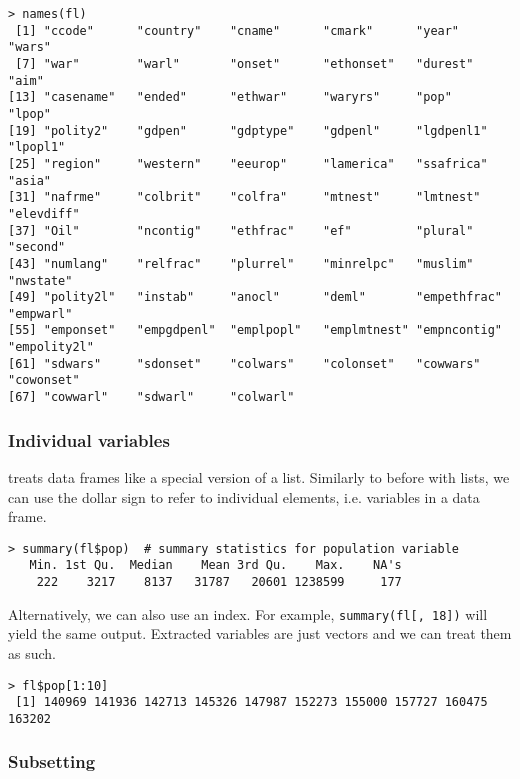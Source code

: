 \begin{lstlisting}
> names(fl)
 [1] "ccode"      "country"    "cname"      "cmark"      "year"       "wars"      
 [7] "war"        "warl"       "onset"      "ethonset"   "durest"     "aim"       
[13] "casename"   "ended"      "ethwar"     "waryrs"     "pop"        "lpop"      
[19] "polity2"    "gdpen"      "gdptype"    "gdpenl"     "lgdpenl1"   "lpopl1"    
[25] "region"     "western"    "eeurop"     "lamerica"   "ssafrica"   "asia"      
[31] "nafrme"     "colbrit"    "colfra"     "mtnest"     "lmtnest"    "elevdiff"  
[37] "Oil"        "ncontig"    "ethfrac"    "ef"         "plural"     "second"    
[43] "numlang"    "relfrac"    "plurrel"    "minrelpc"   "muslim"     "nwstate"   
[49] "polity2l"   "instab"     "anocl"      "deml"       "empethfrac" "empwarl"   
[55] "emponset"   "empgdpenl"  "emplpopl"   "emplmtnest" "empncontig" "empolity2l"
[61] "sdwars"     "sdonset"    "colwars"    "colonset"   "cowwars"    "cowonset"  
[67] "cowwarl"    "sdwarl"     "colwarl"  
\end{lstlisting}

\subsubsection*{Individual variables}

\R treats data frames like a special version of a list. Similarly to before with lists, we can use the dollar sign to refer to individual elements, i.e. variables in a data frame.

\begin{lstlisting}
> summary(fl$pop)  # summary statistics for population variable
   Min. 1st Qu.  Median    Mean 3rd Qu.    Max.    NA's 
    222    3217    8137   31787   20601 1238599     177 
\end{lstlisting}

Alternatively, we can also use an index. For example, \verb|summary(fl[, 18])| will yield the same output. Extracted variables are just vectors and we can treat them as such.

\begin{lstlisting}
> fl$pop[1:10]
 [1] 140969 141936 142713 145326 147987 152273 155000 157727 160475 163202
\end{lstlisting}

\subsubsection*{Subsetting}

